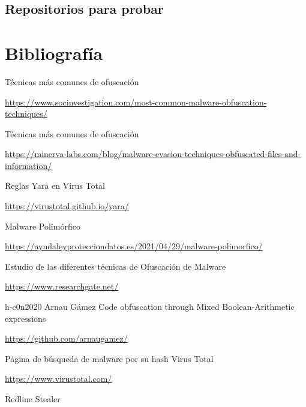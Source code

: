\documentclass[15pt]{article}
\begin{document}
	\subsection{Repositorios para probar}
	
	\newpage
	\listoffigures
	\lstlistoflistings
	\newpage
	\section{Bibliografía}
	\begin{thebibliography}{40}
		Técnicas más comunes de ofuscación
		
		\href{https://www.socinvestigation.com/most-common-malware-obfuscation-techniques/}{https://www.socinvestigation.com/most-common-malware-obfuscation-techniques/}
		
		Técnicas más comunes de ofuscación
		
		\href{https://minerva-labs.com/blog/malware-evasion-techniques-obfuscated-files-and-information/}{https://minerva-labs.com/blog/malware-evasion-techniques-obfuscated-files-and-information/}
		
		Reglas Yara en Virus Total
		
		\href{https://virustotal.github.io/yara/}{https://virustotal.github.io/yara/}
		
		Malware Polimórfico
		
		\href{https://ayudaleyprotecciondatos.es/2021/04/29/malware-polimorfico/}{https://ayudaleyprotecciondatos.es/2021/04/29/malware-polimorfico/}
		
		Estudio de las diferentes técnicas de Ofuscación de Malware
		
		\href{https://www.researchgate.net/publication/357255382_Metamorphic_Malware_and_Obfuscation_-A_Survey_of_Techniques_Variants_and_Generation_Kits}{https://www.researchgate.net/}
		
		
		h-c0n2020 Arnau Gámez Code obfuscation through Mixed Boolean-Arithmetic expressions
		
		\href{https://github.com/arnaugamez/talks/blob/main/2022/00_h-c0n/slides.pdf}{https://github.com/arnaugamez/}
		
		
		Página de búsqueda de malware por su hash Virus Total
		
		\href{https://www.virustotal.com/gui/home/upload}{https://www.virustotal.com/}
		
		Redline Stealer
		

\end{thebibliography}
\end{document}
